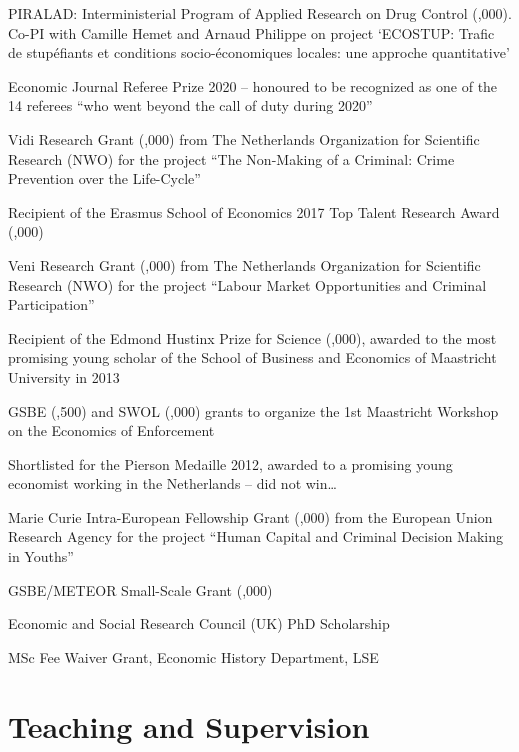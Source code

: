 \documentclass[11pt,a4paper]{article}
\begin{document}
\begin{datelist}
  \item[2024 -- 2026] PIRALAD: Interministerial Program of Applied Research on Drug Control (,000). Co-PI with Camille Hemet and Arnaud Philippe on project `ECOSTUP: Trafic de stup\'efiants et conditions socio-\'economiques locales: une approche quantitative'
  \item[2021] Economic Journal Referee Prize 2020 -- honoured to be recognized as one of the 14 referees ``who went beyond the call of duty during 2020''
  \item[2019 -- 2024] Vidi Research Grant (,000) from The Netherlands Organization for Scientific Research (NWO) for the project ``The Non-Making of a Criminal: Crime Prevention over the Life-Cycle''
  \item[2017] Recipient of the Erasmus School of Economics 2017 Top Talent Research Award (,000)
  \item[2012 -- 2015] Veni Research Grant (,000) from The Netherlands Organization for Scientific Research (NWO) for the project ``Labour Market Opportunities and Criminal Participation''
  \item[2013] Recipient of the Edmond Hustinx Prize for Science (,000), awarded to the most promising young scholar of the School of Business and Economics of Maastricht University in 2013
  \item[2013] GSBE (,500) and SWOL (,000) grants to organize the 1st Maastricht Workshop on the Economics of Enforcement
  \item[2012] Shortlisted for the Pierson Medaille 2012, awarded to a promising young economist working in the Netherlands -- did not win\ldots
  \item[2010 -- 2012] Marie Curie Intra-European Fellowship Grant (,000) from the European Union Research Agency for the project ``Human Capital and Criminal Decision Making in Youths''
  \item[2010 -- 2011] GSBE/METEOR Small-Scale Grant (,000)
  \item[2005 -- 2009] Economic and Social Research Council (UK) PhD Scholarship
  \item[2000 -- 2001] MSc Fee Waiver Grant, Economic History Department, LSE
\end{datelist}

\section{Teaching and Supervision}
\end{document}
